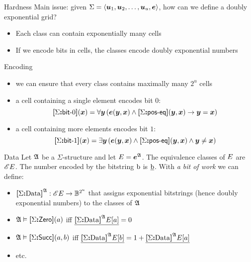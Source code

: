 \documentclass{beamer}
\begin{document}
\begin{frame}{Hardness}
Main issue: given $\Sigma = \left\langle \bm{u}_{1},\bm{u}_{2},\dots,\bm{u}_{u},\bm{e} \right\rangle$,
how can we define a doubly exponential grid?
\pause
\begin{itemize}
  \item
  Each class can contain exponentially many cells
  
  \item
  If we encode bits in cells, the classes encode doubly exponential numbers
\end{itemize}
\end{frame}

\begin{frame}{Encoding}
\begin{itemize}
  \item
  we can ensure that every class contains maximally many $2^u$ cells
  
  \item
  a cell containing a single element encodes bit $0$:
  \[
    {\bm{[}\Sigma\mathord{\bm{:}}\mathsf{bit}{\hbox{-}}0\bm{]}}(\bm{x}) = \forall\bm{y} \left(
    \bm{e}(\bm{y},\bm{x}) \land {\bm{[}\Sigma\mathord{\bm{:}}\mathsf{pos}{\hbox{-}}\mathsf{eq}\bm{]}}(\bm{y},\bm{x}) \rightarrow \bm{y} = \bm{x}\right)
  \] 
  
  \item
  a cell containing more elements encodes bit $1$:
  \[
    {\bm{[}\Sigma\mathord{\bm{:}}\mathsf{bit}{\hbox{-}}1\bm{]}}(\bm{x}) = \exists\bm{y} \left(
    \bm{e}(\bm{y},\bm{x}) \land {\bm{[}\Sigma\mathord{\bm{:}}\mathsf{pos}{\hbox{-}}\mathsf{eq}\bm{]}}(\bm{y},\bm{x}) \land \bm{y} \neq \bm{x}\right)
  \]
\end{itemize}
\end{frame}

\begin{frame}{Data}
Let $\mathfrak{A}$ be a $\Sigma$-structure and let $E = \bm{e}^{\mathfrak{A}}$.
The equivalence classes of $E$ are ${\mathscr{E}E}$.
The number encoded by the bitstring $\mathrm{b}$ is $\underline{\mathrm{b}}$.
With \emph{a bit of work} we can define:
\begin{itemize}
  \item
  ${\bm{[}\Sigma\mathord{\bm{:}}\mathrm{Data}\bm{]}}^{\mathfrak{A}} : {\mathscr{E}E} \to \mathbb{B}^{2^u}$ that assigns
  exponential bitstrings (hence doubly exponential numbers) to the classes of
  $\mathfrak{A}$
  
  \item $\mathfrak{A}\vDash{\bm{[}\Sigma\mathord{\bm{:}}\mathsf{Zero}\bm{]}}(a)$ iff
  $\underline{{\bm{[}\Sigma\mathord{\bm{:}}\mathrm{Data}\bm{]}}^{\mathfrak{A}}{E[a]}} = 0$
  
  \item $\mathfrak{A}\vDash{\bm{[}\Sigma\mathord{\bm{:}}\mathsf{Succ}\bm{]}}(a,b)$ iff
  $\underline{{\bm{[}\Sigma\mathord{\bm{:}}\mathrm{Data}\bm{]}}^{\mathfrak{A}}{E[b]}} = 1 +
  \underline{{\bm{[}\Sigma\mathord{\bm{:}}\mathrm{Data}\bm{]}}^{\mathfrak{A}}{E[a]}}$
  
  \item etc.
\end{itemize}
\end{frame}
\end{document}
